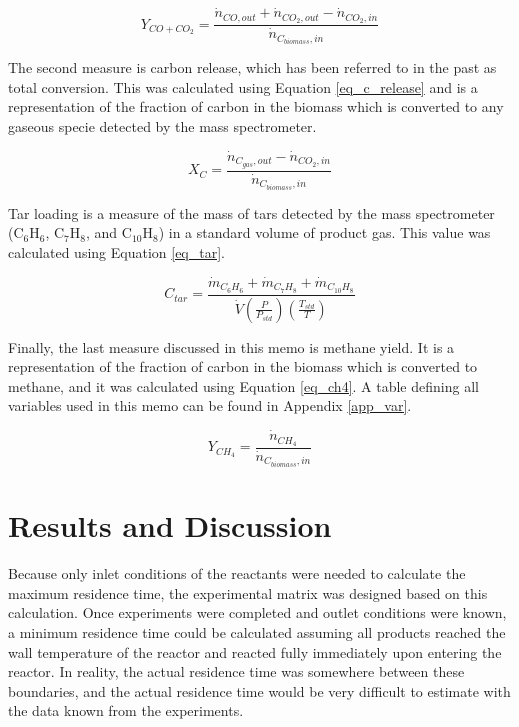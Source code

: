 \documentclass[11pt,twocolumn]{article}
\begin{document}
\begin{equation}
	Y_{CO+CO_2} = \frac{\dot{n}_{CO,out}+\dot{n}_{CO_2,out} - \dot{n}_{CO_2,in}}{\dot{n}_{C_{biomass},in}}
	\label{eq_c_yield}
\end{equation}

The second measure is carbon release, which has been referred to in the past as total conversion.  This was calculated using Equation \ref{eq_c_release} and is a representation of the fraction of carbon in the biomass which is converted to any gaseous specie detected by the mass spectrometer.

\begin{equation}
	X_{C} = \frac{\dot{n}_{C_{gas},out}- \dot{n}_{CO_2,in}}{\dot{n}_{C_{biomass},in}}
	\label{eq_c_release}
\end{equation}

Tar loading is a measure of the mass of tars detected by the mass spectrometer (C$_6$H$_6$, C$_7$H$_8$, and C$_{10}$H$_8$) in a standard volume of product gas.  This value was calculated using Equation \ref{eq_tar}.

\begin{equation}
	C_{tar} = \frac{\dot{m}_{C_6H_6}+\dot{m}_{C_7H_8} + \dot{m}_{C_{10}H_8}}{\dot{V}(\frac{P}{P_{std}})(\frac{T_{std}}{T})}
	\label{eq_tar}
\end{equation}

Finally, the last measure discussed in this memo is methane yield.  It is a representation of the fraction of carbon in the biomass which is converted to methane, and it was calculated using Equation \ref{eq_ch4}.  A table defining all variables used in this memo can be found in Appendix \ref{app_var}.

\begin{equation}
	Y_{CH_4} = \frac{\dot{n}_{CH_4}}{\dot{n}_{C_{biomass},in}}
	\label{eq_ch4}
\end{equation}


\section*{Results and Discussion}

Because only inlet conditions of the reactants were needed to calculate the maximum residence time, the experimental matrix was designed based on this calculation.  Once experiments were completed and outlet conditions were known, a minimum residence time could be calculated assuming all products reached the wall temperature of the reactor and reacted fully immediately upon entering the reactor.  In reality, the actual residence time  was somewhere between these boundaries, and the actual residence time would be very difficult to estimate with the data known from the experiments.  
\end{document}
